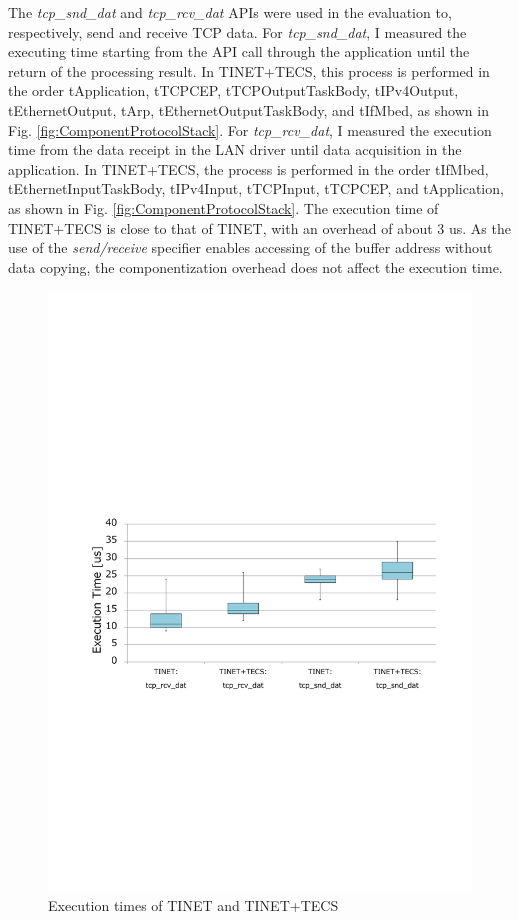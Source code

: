 \documentclass[a4j,12pt,oneside,openany,english]{jsbook}
\begin{document}
The {\it tcp\_snd\_dat} and {\it tcp\_rcv\_dat} APIs were used in the evaluation to, respectively, send and receive TCP data.
For {\it tcp\_snd\_dat}, I measured the executing time starting from the API call through the application until the return of the processing result.
In TINET+TECS, this process is performed in the order tApplication, tTCPCEP, tTCPOutputTaskBody, tIPv4Output, tEthernetOutput, tArp, tEthernetOutputTaskBody, and tIfMbed, as shown in Fig. \ref{fig:ComponentProtocolStack}.
For {\it tcp\_rcv\_dat}, I measured the execution time from the data receipt in the LAN driver until data acquisition in the application.
In TINET+TECS, the process is performed in the order tIfMbed, tEthernetInputTaskBody, tIPv4Input, tTCPInput, tTCPCEP, and tApplication, as shown in Fig. \ref{fig:ComponentProtocolStack}.
The execution time of TINET+TECS is close to that of TINET, with an overhead of about 3 us.
As the use of the {\it send/receive} specifier enables accessing of the buffer address without data copying, the componentization overhead does not affect the execution time.

\begin{figure}[t]
    \centering
    \includegraphics[width=12cm,clip]{figure/EvaluationOfExecutionTime.pdf}
    \caption{Execution times of TINET and TINET+TECS}
    \label{fig:EvaluationOfExecutionTime}
\end{figure}
\end{document}

